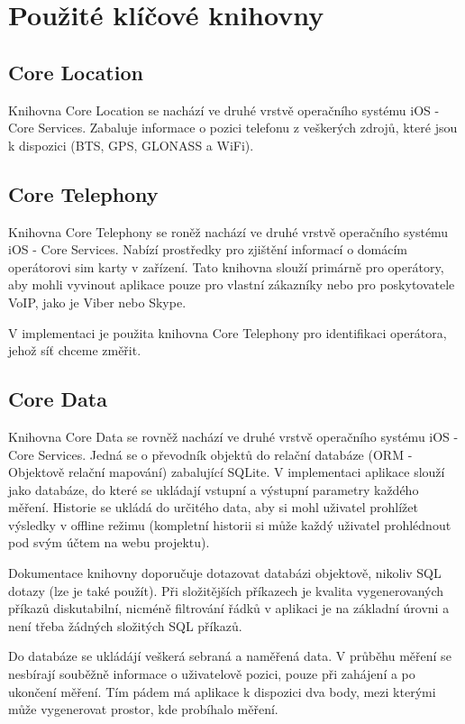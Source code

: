 \newpage

\section{Použité klíčové knihovny}

\subsection{Core Location}
Knihovna Core Location se nachází ve druhé vrstvě operačního systému iOS - Core Services. Zabaluje informace o pozici telefonu z veškerých zdrojů, které jsou k dispozici (BTS, GPS, GLONASS a WiFi).

\subsection{Core Telephony}
Knihovna Core Telephony se roněž nachází ve druhé vrstvě operačního systému iOS - Core Services. Nabízí prostředky pro zjištění informací o domácím operátorovi sim karty v zařízení. Tato knihovna slouží primárně pro operátory, aby mohli vyvinout aplikace pouze pro vlastní zákazníky nebo pro poskytovatele VoIP, jako je Viber nebo Skype.

V implementaci je použita knihovna Core Telephony pro identifikaci operátora, jehož síť chceme změřit.

\subsection{Core Data}
Knihovna Core Data se rovněž nachází ve druhé vrstvě operačního systému iOS - Core Services. Jedná se o převodník objektů do relační databáze (ORM - Objektově relační mapování) zabalující SQLite. V implementaci aplikace slouží jako databáze, do které se ukládají vstupní a výstupní parametry každého měření. Historie se ukládá do určitého data, aby si mohl uživatel prohlížet výsledky v offline režimu (kompletní historii si může každý uživatel prohlédnout pod svým účtem na webu projektu).

Dokumentace knihovny doporučuje dotazovat databázi objektově, nikoliv SQL dotazy (lze je také použít). Při složitějších příkazech je kvalita vygenerovaných příkazů diskutabilní, nicméně filtrování řádků v aplikaci je na základní úrovni a není třeba žádných složitých SQL příkazů.

Do databáze se ukládájí veškerá sebraná a naměřená data. V průběhu měření se nesbírají souběžně informace o uživatelově pozici, pouze při zahájení a po ukončení měření. Tím pádem má aplikace k dispozici dva body, mezi kterými může vygenerovat prostor, kde probíhalo měření.

